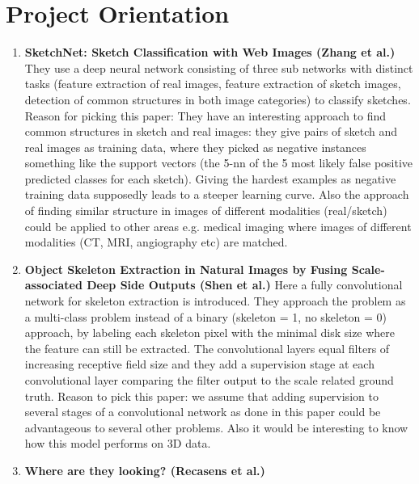 \documentclass{article}
\begin{document}
\section{Project Orientation}
\begin{enumerate}
\item \textbf{SketchNet: Sketch Classification with Web Images (Zhang et al.)} They use a deep neural network consisting of three sub networks with distinct tasks (feature extraction of real images, feature extraction of sketch images, detection of common structures in both image categories)  to classify sketches. Reason for picking this paper: They have an interesting approach to find common structures in sketch and real images: they give pairs of sketch and real images as training data, where they picked as negative instances something like the support vectors (the 5-nn of the 5 most likely false positive predicted classes for each sketch). Giving the hardest examples as negative training data supposedly leads to a steeper learning curve. Also the approach of finding similar structure in images of different modalities (real/sketch) could be applied to other areas e.g. medical imaging where images of different modalities (CT, MRI, angiography etc) are matched.
\item \textbf{Object Skeleton Extraction in Natural Images by Fusing Scale-associated Deep
Side Outputs (Shen et al.)} Here a fully convolutional network for skeleton extraction is introduced. They approach the problem as a multi-class problem instead of a binary (skeleton = 1, no skeleton = 0) approach, by labeling each skeleton pixel with the minimal disk size where the feature can still be extracted. The convolutional layers equal filters of increasing receptive field size and they add a supervision stage at each convolutional layer comparing the filter output to the scale related ground truth. Reason to pick this paper: we assume that adding supervision to several stages of a convolutional network as done in this paper could be advantageous to several other problems. Also it would be interesting to know how this model performs on 3D data.
\item \textbf{Where are they looking? (Recasens et al.)}
\end{enumerate}
\end{document}
